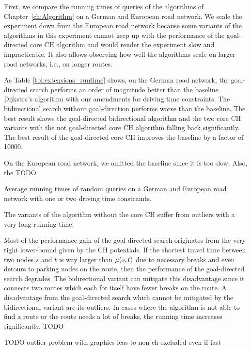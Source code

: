 First, we compare the running times of queries of the algorithms of Chapter~\ref{ch:Algorithm} on a German and European road network. We scale the experiment down from the European road network because some variants of the algorithms in this experiment cannot keep up with the performance of the goal-directed core CH algorithm and would render the experiment slow and impracticable. It also allows observing how well the algorithms scale on larger road networks, i.e., on longer routes.

As Table \ref{tbl:extensions_runtime} shows, on the German road network, the goal-directed search performs an order of magnitude better than the baseline Dijkstra's algorithm with our amendments for driving time constraints. The bidirectional search without goal-direction performs worse than the baseline. The best result shows the goal-directed bidirectional algorithm and the two core CH variants with the not goal-directed core CH algorithm falling back significantly. The best result of the goal-directed core CH improves the baseline by a factor of \num{10000}.

On the European road network, we omitted the baseline since it is too slow. Also, the  TODO

\begin{table}[hbtp]
	\centering
	
	\caption{Average running times of random queries on a German and European road network with one or two driving time constraints.}
	\label{tbl:extensions_runtime}
\end{table}

The variants of the algorithm without the core CH suffer from outliers with a very long running time.

Most of the performance gain of the goal-directed search originates from the very tight lower-bound given by the CH potentials. If the shortest travel time between two nodes $s$ and $t$ is way larger than $\mu(s,t)$ due to necessary breaks and even detours to parking nodes on the route, then the performance of the goal-directed search degrades. The bidirectional variant can mitigate this disadvantage since it connects two routes which each for itself have fewer breaks on the route. A disadvantage from the goal-directed search which cannot be mitigated by the bidirectional variant are its outliers. In cases where the algorithm is not able to find a route or the route needs a lot of breaks, the running time increases significantly. TODO

TODO outlier problem with graphics leas to non ch excluded even if fast

